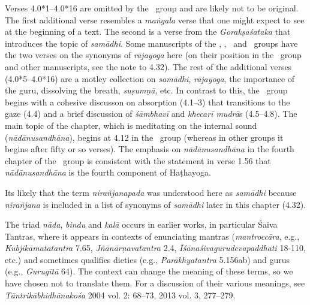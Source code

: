 \begin{ekdosis}
\begin{philcomm}[hp04_000_1]
Verses 4.0*1–4.0*16 are omitted by the \textalpha\ group and are likely not to be original. The first additional verse resembles a \emph{maṅgala} verse that one might expect to see at the beginning of a text. The second is a verse from the \emph{Gorakṣaśataka} that introduces the topic of \emph{samādhi}. Some manuscripts of the \textbeta, \textepsilon, \textzeta\ and \texteta\ groups have the two verses on the synonyms of \emph{rājayoga} here (on their position in the \textalpha\ group and other manuscripts, see the note to 4.32). The rest of the additional verses (4.0*5–4.0*16) are a motley collection on \emph{samādhi}, \emph{rājayoga}, the importance of the guru, dissolving the breath, \emph{suṣumṇā}, etc. In contrast to this, the \textalpha\ group begins with a cohesive discusson on absorption (4.1–3) that transitions to the gaze (4.4) and a brief discussion of \emph{śāmbhavī} and \emph{khecarī mudrā}s (4.5–4.8). The main topic of the chapter, which is meditating on the internal sound (\emph{nādānusandhāna}), begins at 4.12 in the \textalpha\ group (whereas in other groups it begins after fifty or so verses). The emphasis on \emph{nādānusandhāna} in the fourth chapter of the \textalpha\ group is consistent with the statement in verse 1.56 that \emph{nādānusandhāna} is the fourth component of Haṭhayoga.\lb

Its likely that the term \emph{nirañjanapada} was understood here as \emph{samādhi} because \emph{nirañjana} is included in a list of synonyms of \emph{samādhi} later in this chapter (4.32).\lb

The triad \emph{nāda}, \emph{bindu} and \emph{kalā} occurs in earlier works, in particular Śaiva Tantras, where it appears in contexts of enunciating mantras (\emph{mantroccāra}, e.g., \emph{Kubjikāmatatantra} 7.65, \emph{Jñānārṇavatantra} 2.4, \emph{Īśānaśivagurudevapaddhati} 18-110, etc.) and sometimes qualifies dieties (e.g., \emph{Parākhyatantra} 5.156ab) and gurus (e.g., \emph{Gurugītā} 64). The context can change the meaning of these terms, so we have chosen not to translate them. For a discussion of their various meanings, see \emph{Tāntrikābhidhānakośa} 2004 vol. 2: 68–73, 2013 vol. 3, 277–279.  


\end{philcomm}


\end{ekdosis}
